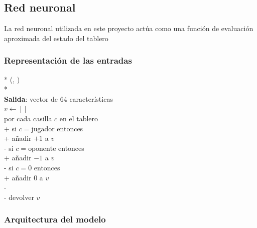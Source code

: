\documentclass[conference,a4paper]{IEEEtran}
\begin{document}
\subsection{Red neuronal}

La red neuronal utilizada en este proyecto actúa como una función de evaluación aproximada del estado del tablero

\vspace{5em}






\subsubsection{Representación de las entradas}

\begin{center}
\begin{minipage}{0.95\linewidth}
\small
\begin{pseudo}*
  (, ) \\*
   \\
 \textbf{Salida}: vector de 64 características \\
  \( v \leftarrow [] \) \\
  por cada casilla \( c \) en el tablero\\+
    si \( c = \text{jugador} \) entonces \\+
      añadir \( +1 \) a \( v \) \\-
    si \( c = \text{oponente} \) entonces \\+
      añadir \( -1 \) a \( v \) \\-
    si \( c = 0 \) entonces \\+
      añadir \( 0 \) a \( v \) \\-\\-
  devolver \( v \)
\end{pseudo}
\label{pcd:codificarTablero}
\end{minipage}
\end{center}



\subsubsection{Arquitectura del modelo}
\end{document}
